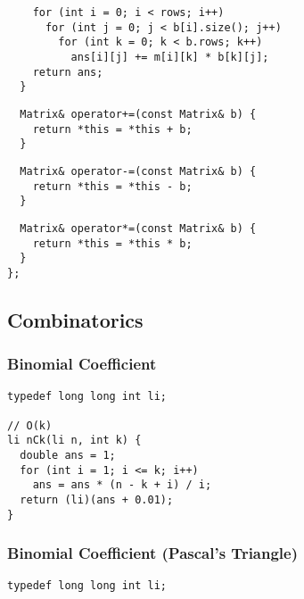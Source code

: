 \documentclass[twoside]{article}
\newcommand{\fileTitleStyle}{\large\underline}
\begin{document}
\begin{multicols*}{2}
\begin{verbatim}
    for (int i = 0; i < rows; i++)
      for (int j = 0; j < b[i].size(); j++)
        for (int k = 0; k < b.rows; k++)
          ans[i][j] += m[i][k] * b[k][j];
    return ans;
  }
\end{verbatim}
\vspace{-12pt}
\begin{verbatim}
  Matrix& operator+=(const Matrix& b) {
    return *this = *this + b;
  }
\end{verbatim}
\vspace{-12pt}
\begin{verbatim}
  Matrix& operator-=(const Matrix& b) {
    return *this = *this - b;
  }
\end{verbatim}
\vspace{-12pt}
\begin{verbatim}
  Matrix& operator*=(const Matrix& b) {
    return *this = *this * b;
  }
};
\end{verbatim}

\subsectionfont{\centering\bfseries\LARGE}
\vspace{0em}
\subsection*{Combinatorics}
\vspace{2em}
\subsubsectionfont{\centering\bfseries\Large}
\subsubsectionfont{\fileTitleStyle}
\subsubsection*{Binomial Coefficient}
\begin{verbatim}
typedef long long int li;

// O(k)
li nCk(li n, int k) {
  double ans = 1;
  for (int i = 1; i <= k; i++)
    ans = ans * (n - k + i) / i;
  return (li)(ans + 0.01);
}
\end{verbatim}

\subsubsectionfont{\centering\bfseries\Large}
\subsubsectionfont{\fileTitleStyle}
\subsubsection*{Binomial Coefficient (Pascal's Triangle)}
\begin{verbatim}
typedef long long int li;


\end{verbatim}
\end{multicols*}
\end{document}
